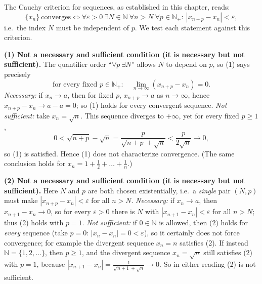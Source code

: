 \documentclass[11pt,a4paper]{article}
\newenvironment{solution}[1]{%
  \par\addvspace{1.7ex}%
  \noindent{\color{solutioncolor}\textbf{#1}}\hspace{0.55em}\ignorespaces}%
  {\par\addvspace{0.9ex}}
\begin{document}
\begin{solution}{Solution 2.3.12}\label{xs:2.3.12}
The Cauchy criterion for sequences, as established in this chapter, reads:
\[
\{x_n\}\ \text{converges}\iff
\forall\varepsilon>0\ \exists N\in\mathbb N\ \forall n>N\ \forall p\in\mathbb N_+:\ |x_{n+p}-x_n|<\varepsilon ,
\]
i.e.\ the index $N$ must be independent of $p$. We test each statement against this criterion.

\textbf{(1) Not a necessary and sufficient condition (it is necessary but not sufficient).}
The quantifier order ``$\forall p\ \exists N$'' allows $N$ to depend on $p$, so (1) says precisely
\[
\text{for every fixed }p\in\mathbb N_+:\quad \lim_{n\to\infty}(x_{n+p}-x_n)=0 .
\]
\emph{Necessary:} if $x_n\to a$, then for fixed $p$, $x_{n+p}\to a$ as $n\to\infty$, hence $x_{n+p}-x_n\to a-a=0$; so (1) holds for every convergent sequence.
\emph{Not sufficient:} take $x_n=\sqrt n$. This sequence diverges to $+\infty$, yet for every fixed $p\ge1$,
\[
0<\sqrt{n+p}-\sqrt n=\frac{p}{\sqrt{n+p}+\sqrt n}<\frac{p}{2\sqrt n}\longrightarrow0 ,
\]
so (1) is satisfied. Hence (1) does not characterize convergence. (The same conclusion holds for $x_n=1+\frac12+\dots+\frac1n$.)

\textbf{(2) Not a necessary and sufficient condition (it is necessary but not sufficient).}
Here $N$ and $p$ are both chosen existentially, i.e.\ a \emph{single} pair $(N,p)$ must make $|x_{n+p}-x_n|<\varepsilon$ for all $n>N$.
\emph{Necessary:} if $x_n\to a$, then $x_{n+1}-x_n\to0$, so for every $\varepsilon>0$ there is $N$ with $|x_{n+1}-x_n|<\varepsilon$ for all $n>N$; thus (2) holds with $p=1$.
\emph{Not sufficient:} if $0\in\mathbb N$ is allowed, then (2) holds for \emph{every} sequence (take $p=0$: $|x_n-x_n|=0<\varepsilon$), so it certainly does not force convergence; for example the divergent sequence $x_n=n$ satisfies (2). If instead $\mathbb N=\{1,2,\dots\}$, then $p\ge1$, and the divergent sequence $x_n=\sqrt n$ still satisfies (2) with $p=1$, because $|x_{n+1}-x_n|=\frac{1}{\sqrt{n+1}+\sqrt n}\to0$. So in either reading (2) is not sufficient.


\end{solution}
\end{document}
